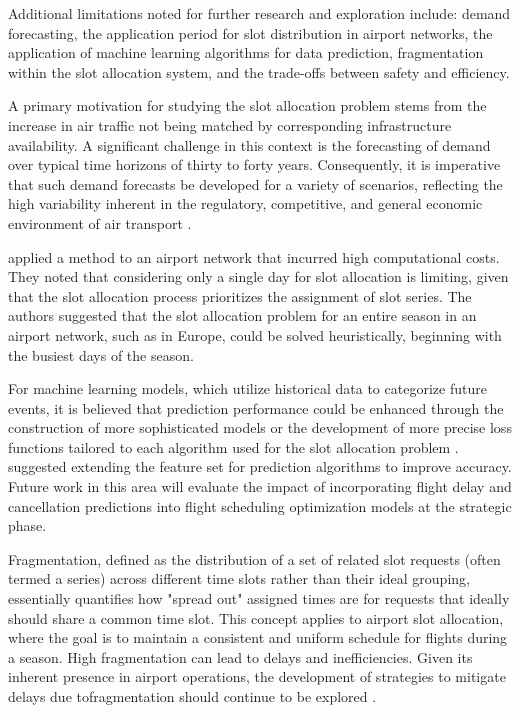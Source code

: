 Additional limitations noted for further research and exploration include: demand forecasting, the application period for slot distribution in airport networks, the application of machine learning algorithms for data prediction, fragmentation within the slot allocation system, and the trade-offs between safety and efficiency.

A primary motivation for studying the slot allocation problem stems from the increase in air traffic not being matched by corresponding infrastructure availability. A significant challenge in this context is the forecasting of demand over typical time horizons of thirty to forty years. Consequently, it is imperative that such demand forecasts be developed for a variety of scenarios, reflecting the high variability inherent in the regulatory, competitive, and general economic environment of air transport \cite{jacquillat_interairline_2018}.

 applied a method to an airport network that incurred high computational costs. They noted that considering only a single day for slot allocation is limiting, given that the slot allocation process prioritizes the assignment of slot series. The authors suggested that the slot allocation problem for an entire season in an airport network, such as in Europe, could be solved heuristically, beginning with the busiest days of the season.

For machine learning models, which utilize historical data to categorize future events, it is believed that prediction performance could be enhanced through the construction of more sophisticated models or the development of more precise loss functions tailored to each algorithm used for the slot allocation problem \cite{zografos_bi-objective_2019}.  suggested extending the feature set for prediction algorithms to improve accuracy. Future work in this area will evaluate the impact of incorporating flight delay and cancellation predictions into flight scheduling optimization models at the strategic phase.

Fragmentation, defined as the distribution of a set of related slot requests (often termed a series) across different time slots rather than their ideal grouping, essentially quantifies how "spread out" assigned times are for requests that ideally should share a common time slot. This concept applies to airport slot allocation, where the goal is to maintain a consistent and uniform schedule for flights during a season. High fragmentation can lead to delays and inefficiencies. Given its inherent presence in airport operations, the development of strategies to mitigate delays due tofragmentation should continue to be explored \cite{kuran_heuristic_nodate}.

